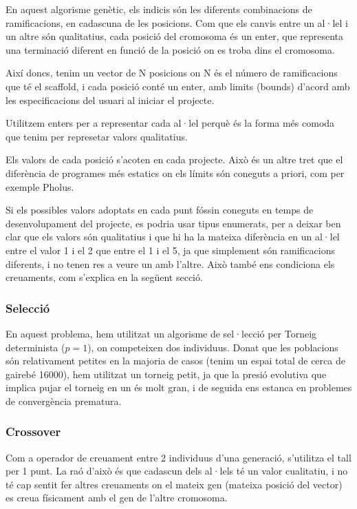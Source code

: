 En aquest algorisme genètic, els indicis són les diferents combinacions de
ramificacions, en cadascuna de les posicions. Com que els canvis entre un al·lel i un
altre són qualitatius, cada posició del cromosoma és un enter, que representa
una terminació diferent en funció de la posició on es troba dins el cromosoma.

Així doncs, tenim un vector de N posicions on N és el número de ramificacions que té
el scaffold, i cada posició conté un enter, amb limits (bounds) d'acord amb les
especificacions del usuari al iniciar el projecte. 

Utilitzem enters per a representar cada al·lel perquè és la forma més comoda que
tenim per represetar valors qualitatius.

Els valors de cada posició s'acoten en cada projecte.  Això és un
altre tret que el diferència de programes més estatics on els límits són
coneguts a priori, com per exemple Pholus.

Si els possibles valors adoptats en cada punt fóssin coneguts en temps de
desenvolupament del projecte, es podria usar tipus enumerats, per a deixar ben
clar que els valors són qualitatius i que hi ha la mateixa diferència en un
al·lel entre el valor 1 i el 2 que entre el 1 i el 5, ja que simplement són
ramificacions diferents, i no tenen res a veure un amb l'altre.  Això també ens
condiciona els creuaments, com s'explica en la següent secció.


\subsubsection{Selecció} %
\label{ssub:CSeleccio}
En aquest problema, hem utilitzat un algorisme de sel·lecció per Torneig
determinista ($p=1$), on competeixen dos individuus.  Donat que les poblacions
són relativament petites en la majoria de casos (tenim un espai total de cerca
de gairebé 16000), hem utilitzat un torneig petit, ja que la presió evolutiva
que implica pujar el torneig en un és molt gran, i de seguida ens estanca en
problemes de convergència prematura.


\subsubsection{Crossover} %
\label{ssub:Crossover}

Com a operador de creuament entre 2 individuus d'una generació, s'utilitza el
tall per 1 punt.  La raó d'això és que cadascun dels al·lels té un valor
cualitatiu, i no té cap sentit fer altres creuaments on el mateix gen (mateixa
posició del vector) es creua físicament amb el gen de l'altre cromosoma.

